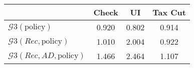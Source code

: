 \begin{tabular}{@{}lccc@{}}
\toprule
                          & Check      & UI    & Tax Cut    \\  \midrule
$\mathcal{G}3(\text{policy})$ & 0.920  & 0.802  & 0.914     \\
$\mathcal{G}3(Rec,\text{policy})$ & 1.010  & 2.004  & 0.922     \\
$\mathcal{G}3(Rec, AD,\text{policy})$ & 1.466  & 2.464  & 1.107     \\
\end{tabular}
